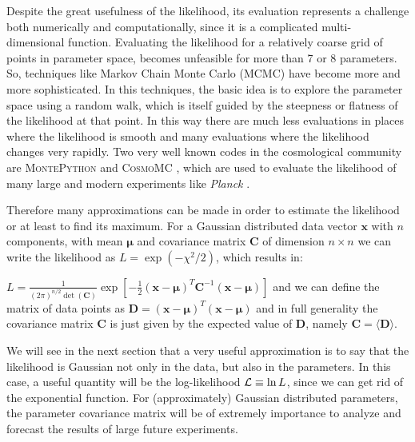 Despite the great usefulness of the likelihood, its evaluation represents a challenge both numerically
and computationally, since it is a complicated multi-
dimensional function.
Evaluating the likelihood for a relatively coarse grid of points in parameter space, becomes unfeasible for 
more than 7 or 8 parameters. So, techniques like Markov Chain Monte Carlo (MCMC) \cite{cite some basic MCMC literature}
 have become more and more sophisticated. In this techniques, the basic idea is to explore the parameter
 space using a random walk, which is itself guided by the steepness or flatness of the likelihood at that point.
 In this way there are much less evaluations in places where the likelihood is smooth and many evaluations
 where the likelihood changes very rapidly. Two very well known
 codes in the cosmological community are \textsc{MontePython} and \textsc{CosmoMC} \cite{cite Cosmomc and Montepython},
 which are used to evaluate the likelihood of many large and modern experiments like \textit{Planck} \cite{cite Planck}.
 
Therefore many approximations can be made in order to estimate the likelihood or at least 
to find its maximum. 
For a Gaussian distributed data vector $\bm{x}$ with $n$ components, 
with mean $\bm{\mu}$ and covariance matrix $\bm{C}$ of dimension $n\times n$ we can 
write the likelihood as $L = \exp(-\chi^2/2)$, which results in: 

\beeq$ \label{eq:moreGeneral-Gaussian-Likelihood}
L=\frac{1}{(2\pi)^{n/2} \det (\bm{C}) } \exp \left[-\frac{1}{2} 
(\bm{x}-\bm{\mu})^T \bm{C}^{-1} (\bm{x}-\bm{\mu}) \right]
$
and we can define the matrix of data points as $\bm{D} = (\bm{x}-\bm{\mu})^T  (\bm{x}-\bm{\mu}) $
and in full generality the covariance matrix $\bm C$ is just given by the expected value of $\bm D$, namely 
$\bm C = \langle \bm D \rangle $.

We will see in the next section that a very useful approximation is to say that the likelihood is Gaussian
not only in the data, but also in the parameters. In this case, a useful quantity will
be the log-likelihood $\mathcal{L} \equiv \ln L$, since we can get rid of the exponential function.
For (approximately) Gaussian distributed parameters, the parameter covariance matrix will be of extremely
importance to analyze and forecast the results of large future experiments.


